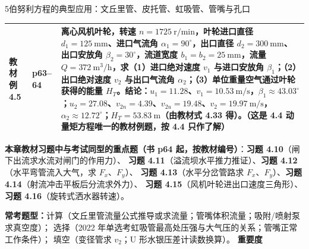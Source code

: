 \begin{kaodian}{5}{伯努利方程的典型应用：文丘里管、皮托管、虹吸管、管嘴与孔口}
\begin{center}
\begin{tabularx}{\textwidth}{@{}llX@{}}
\textbf{教材例 4.5} & p63--64 & \textbf{离心风机叶轮}，转速 $n=1725\ \mathrm{r/min}$，叶轮进口直径 $d_1=125\ \mathrm{mm}$、进口气流角 $\alpha_1=90^{\circ}$，出口直径 $d_2=300\ \mathrm{mm}$、出口安放角 $\beta_2=30^{\circ}$，流道宽度 $b_1=b_2=25\ \mathrm{mm}$，流量 $Q=372\ \mathrm{m^3/h}$，求（1）进口绝对速度 $v_1$ 与进口安放角 $\beta_1$；（2）出口绝对速度 $v_2$ 与出口气流角 $\alpha_2$；（3）单位重量空气通过叶轮获得的能量 $H_T$。结论：$u_1=11.28$、$v_1=10.53\ \mathrm{m/s}$，$\beta_1\approx43.03^{\circ}$；$u_2=27.08$、$v_{2n}=4.39$、$v_{2u}=19.48$、$v_2=19.97\ \mathrm{m/s}$，$\alpha_2\approx12.72^{\circ}$；$H_T=53.83\ \mathrm{m}$（由\textbf{教材式 4.33} 得）。（\textbf{这是 4.4 动量矩方程唯一的教材例题，按 4.4 只作了解}）\\
\bottomrule
\end{tabularx}
\end{center}

\textbf{本章教材习题中与考试同型的重点题（书 p64 起，按教材编号）}：\textbf{习题 4.10}（闸下出流求水流对闸门的作用力）、
\textbf{习题 4.11}（溢流坝水平推力推证）、\textbf{习题 4.12}（水平弯管流入大气，求 $F_x$、$F_y$）、
\textbf{习题 4.13}（水平分岔管路求 $F_x$、$F_y$）、\textbf{习题 4.14}（射流冲击平板后分流求外力）、
\textbf{习题 4.15}（风机叶轮进出口速度三角形）、\textbf{习题 4.16}（旋转式洒水器转速）。

\textbf{常考题型：}计算（文丘里管流量公式推导或求流量；管嘴体积流量；吸附/喷射泵求真空度）；
选择（2022 年单选考虹吸管最高处压强与大气压的关系；管嘴正常工作条件）；
填空（变径管求 $v_2$；U 形水银压差计读数换算）。
\textbf{重要度 }\quad{}\quad{}


\end{kaodian}
